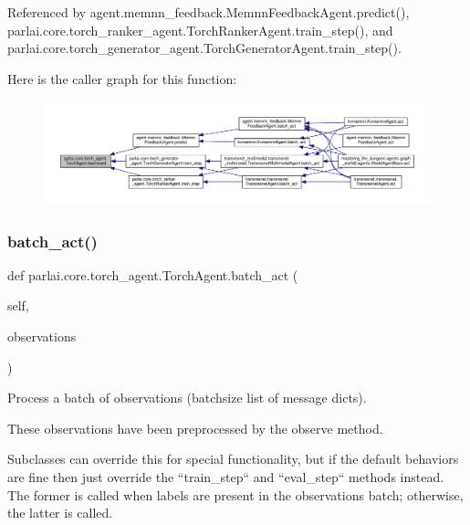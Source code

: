 Referenced by agent.\+memnn\+\_\+feedback.\+Memnn\+Feedback\+Agent.\+predict(), parlai.\+core.\+torch\+\_\+ranker\+\_\+agent.\+Torch\+Ranker\+Agent.\+train\+\_\+step(), and parlai.\+core.\+torch\+\_\+generator\+\_\+agent.\+Torch\+Generator\+Agent.\+train\+\_\+step().

Here is the caller graph for this function\+:
\nopagebreak
\begin{figure}[H]
\begin{center}
\leavevmode
\includegraphics[width=350pt]{classparlai_1_1core_1_1torch__agent_1_1TorchAgent_a8df662b1258ec67752b4fc0ad45733f9_icgraph}
\end{center}
\end{figure}
\mbox{\label{classparlai_1_1core_1_1torch__agent_1_1TorchAgent_a7754a74d6c87590f46e71ec486c285a8}} 
\subsubsection{\texorpdfstring{batch\+\_\+act()}{batch\_act()}}
{\footnotesize\ttfamily def parlai.\+core.\+torch\+\_\+agent.\+Torch\+Agent.\+batch\+\_\+act (\begin{DoxyParamCaption}\item[{}]{self,  }\item[{}]{observations }\end{DoxyParamCaption})}

\begin{DoxyVerb}Process a batch of observations (batchsize list of message dicts).

These observations have been preprocessed by the observe method.

Subclasses can override this for special functionality, but if the
default behaviors are fine then just override the ``train_step`` and
``eval_step`` methods instead. The former is called when labels are
present in the observations batch; otherwise, the latter is called.
\end{DoxyVerb}
 

